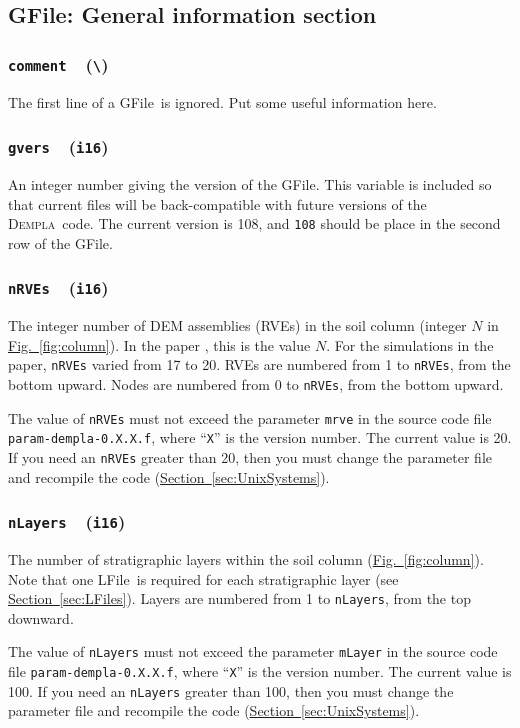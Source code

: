 \documentclass[letterpaper,11pt]{article}
\newcommand{\Dempla}{\textsc{Dempla}}
\newcommand{\Var}[2]{\texttt{#1}\ \  (\texttt{#2})}
\newcommand{\GFile}{\textsf{GFile}}
\newcommand{\LFile}{\textsf{LFile}}
\begin{document}
\subsection{\GFile: General information section}\label{sec:Ggeneral}
%
\subsubsection[\texttt{comment}]{\Var{comment}{\textbackslash}}
The first line of a \GFile\ is ignored.
Put some useful information here.
%
\subsubsection[\texttt{gvers}]{\Var{gvers}{i16}}\label{sec:gvers}
An integer number giving the version of the \GFile.
This variable is included so that current files
will be back-compatible with future versions
of the \Dempla\ code.
The current version is 108,
and \texttt{108} should be place in the second row of the \GFile.
%
\subsubsection[\texttt{nRVEs}]{\Var{nRVEs}{i16}}\label{sec:nRVEs}
The integer number of DEM assemblies (RVEs) in
the soil column
(integer $N$ in \hyperref[fig:column]{Fig.~\ref*{fig:column}}).
In the paper \citep{Kuhn:2021a}, this is the value $N$.
For the simulations in the paper,
\texttt{nRVEs} varied from 17 to 20.
RVEs are numbered from 1 to \texttt{nRVEs}, from the bottom upward.
Nodes are numbered from 0 to \texttt{nRVEs}, from the bottom upward.
\par
The value of \texttt{nRVEs} must not exceed the parameter
\texttt{mrve} in the source code file
\texttt{param-dempla-0.X.X.f}, where ``\texttt{X}'' is the
version number.
The current value is 20.
If you need an \texttt{nRVEs} greater than 20, then
you must change the parameter file and recompile the code
(\hyperref[sec:UnixSystems]{Section~\ref*{sec:UnixSystems}}).
%
\subsubsection[\texttt{nLayers}]{\Var{nLayers}{i16}}\label{sec:nLayers}
The number of stratigraphic layers within the
soil column (\hyperref[fig:column]{Fig.~\ref*{fig:column}}).
Note that one \LFile\ is required for each
stratigraphic layer (see 
\hyperref[sec:LFiles]{Section~\ref*{sec:LFiles}}).
Layers are numbered from 1 to \texttt{nLayers}, from the top downward.
\par
The value of \texttt{nLayers} must not exceed the parameter
\texttt{mLayer} in the source code file
\texttt{param-dempla-0.X.X.f}, where ``\texttt{X}'' is the
version number.
The current value is 100.
If you need an \texttt{nLayers} greater than 100, then
you must change the parameter file and recompile the code
(\hyperref[sec:UnixSystems]{Section~\ref*{sec:UnixSystems}}).
%
\end{document}
